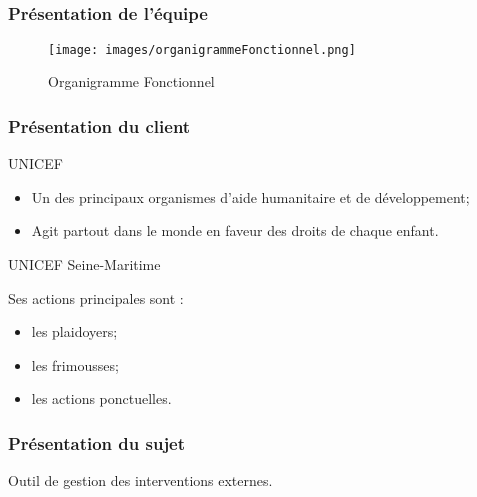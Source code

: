 \subsection{} %

\begin{frame}
\frametitle{Présentation de l'équipe}
	\begin{figure}
		\texttt{[image: images/organigrammeFonctionnel.png]}
		\caption{Organigramme Fonctionnel}
		\label{OF}
	\end{figure}
\end{frame}

\begin{frame}
\frametitle{Présentation du client}
	\begin{center}
		UNICEF
	\end{center}
	\begin{itemize}
		\item Un des principaux organismes d’aide humanitaire et de développement;
		\item Agit partout dans le monde en faveur des droits de chaque enfant.
	\end{itemize}
	
	\begin{center}
		UNICEF Seine-Maritime
	\end{center}
	Ses actions principales sont : 
	\begin{itemize}
		\item les plaidoyers;
		\item les frimousses;
		\item les actions ponctuelles. 
	\end{itemize}
	
\end{frame}
\begin{frame}
\frametitle{Présentation du sujet}
Outil de gestion des interventions externes.

	
\end{frame}